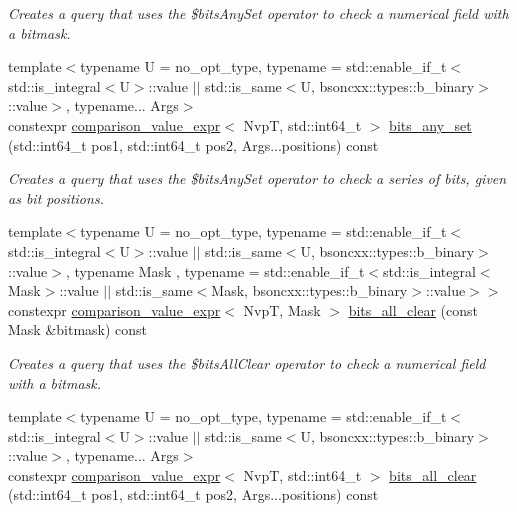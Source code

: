 \begin{DoxyCompactItemize}
\begin{DoxyCompactList}\small\item\em Creates a query that uses the \$bits\+Any\+Set operator to check a numerical field with a bitmask. \end{DoxyCompactList}\item 
{\footnotesize template$<$typename U  = no\+\_\+opt\+\_\+type, typename  = std\+::enable\+\_\+if\+\_\+t$<$std\+::is\+\_\+integral$<$\+U$>$\+::value $\vert$$\vert$                                          std\+::is\+\_\+same$<$\+U, bsoncxx\+::types\+::b\+\_\+binary$>$\+::value$>$, typename... Args$>$ }\\constexpr \hyperlink{classmongo__odm_1_1comparison__value__expr}{comparison\+\_\+value\+\_\+expr}$<$ NvpT, std\+::int64\+\_\+t $>$ \hyperlink{classmongo__odm_1_1nvp__base_aa4a880120be6571a65431dd1a949615b}{bits\+\_\+any\+\_\+set} (std\+::int64\+\_\+t pos1, std\+::int64\+\_\+t pos2, Args...\+positions) const 
\begin{DoxyCompactList}\small\item\em Creates a query that uses the \$bits\+Any\+Set operator to check a series of bits, given as bit positions. \end{DoxyCompactList}\item 
{\footnotesize template$<$typename U  = no\+\_\+opt\+\_\+type, typename  = std\+::enable\+\_\+if\+\_\+t$<$std\+::is\+\_\+integral$<$\+U$>$\+::value $\vert$$\vert$                                          std\+::is\+\_\+same$<$\+U, bsoncxx\+::types\+::b\+\_\+binary$>$\+::value$>$, typename Mask , typename  = std\+::enable\+\_\+if\+\_\+t$<$std\+::is\+\_\+integral$<$\+Mask$>$\+::value $\vert$$\vert$                                          std\+::is\+\_\+same$<$\+Mask, bsoncxx\+::types\+::b\+\_\+binary$>$\+::value$>$$>$ }\\constexpr \hyperlink{classmongo__odm_1_1comparison__value__expr}{comparison\+\_\+value\+\_\+expr}$<$ NvpT, Mask $>$ \hyperlink{classmongo__odm_1_1nvp__base_a6627ef66f30320d09ba1800a01de47e6}{bits\+\_\+all\+\_\+clear} (const Mask \&bitmask) const 
\begin{DoxyCompactList}\small\item\em Creates a query that uses the \$bits\+All\+Clear operator to check a numerical field with a bitmask. \end{DoxyCompactList}\item 
{\footnotesize template$<$typename U  = no\+\_\+opt\+\_\+type, typename  = std\+::enable\+\_\+if\+\_\+t$<$std\+::is\+\_\+integral$<$\+U$>$\+::value $\vert$$\vert$                                          std\+::is\+\_\+same$<$\+U, bsoncxx\+::types\+::b\+\_\+binary$>$\+::value$>$, typename... Args$>$ }\\constexpr \hyperlink{classmongo__odm_1_1comparison__value__expr}{comparison\+\_\+value\+\_\+expr}$<$ NvpT, std\+::int64\+\_\+t $>$ \hyperlink{classmongo__odm_1_1nvp__base_a876a9ea43bedf0d20178ad2bdcf22e1d}{bits\+\_\+all\+\_\+clear} (std\+::int64\+\_\+t pos1, std\+::int64\+\_\+t pos2, Args...\+positions) const 

\end{DoxyCompactItemize}
